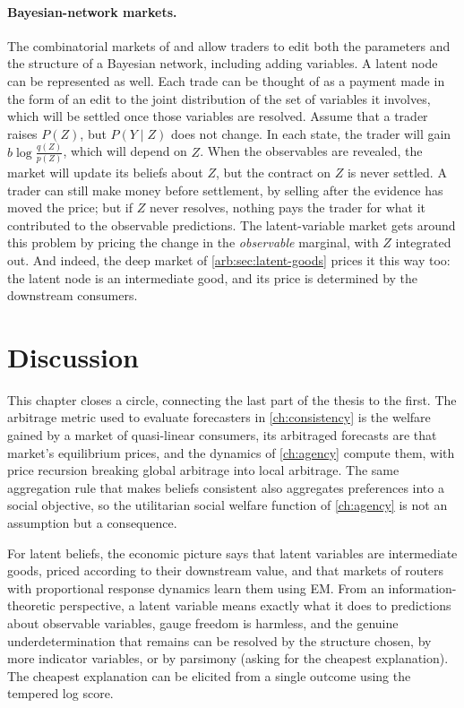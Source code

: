 \begin{draftblock}
\paragraph{Bayesian-network markets.} The combinatorial markets of \citet{sunProbabilityAssetUpdating2012} and \citet{laskeyGraphicalModelMarket2018} allow traders to edit both the parameters and the structure of a Bayesian network, including adding variables. A latent node can be represented as well. Each trade can be thought of as a payment made in the form of an edit to the joint distribution of the set of variables it involves, which will be settled once those variables are resolved. Assume that a trader raises $P(Z)$, but $P(Y\mid Z)$ does not change. In each state, the trader will gain $b\log\frac{q(Z)}{p(Z)}$, which will depend on $Z$. When the observables are revealed, the market will update its beliefs about $Z$, but the contract on $Z$ is never settled. A trader can still make money before settlement, by selling after the evidence has moved the price; but if $Z$ never resolves, nothing pays the trader for what it contributed to the observable predictions. The latent-variable market gets around this problem by pricing the change in the \emph{observable} marginal, with $Z$ integrated out. And indeed, the deep market of \cref{arb:sec:latent-goods} prices it this way too: the latent node is an intermediate good, and its price is determined by the downstream consumers.

\section{Discussion}\label{arb:sec:discussion}

This chapter closes a circle, connecting the last part of the thesis to the first. The arbitrage metric used to evaluate forecasters in \cref{ch:consistency} is the welfare gained by a market of quasi-linear consumers, its arbitraged forecasts are that market's equilibrium prices, and the dynamics of \cref{ch:agency} compute them, with price recursion breaking global arbitrage into local arbitrage. The same aggregation rule that makes beliefs consistent also aggregates preferences into a social objective, so the utilitarian social welfare function of \cref{ch:agency} is not an assumption but a consequence.

For latent beliefs, the economic picture says that latent variables are intermediate goods, priced according to their downstream value, and that markets of routers with proportional response dynamics learn them using EM. From an information-theoretic perspective, a latent variable means exactly what it does to predictions about observable variables, gauge freedom is harmless, and the genuine underdetermination that remains can be resolved by the structure chosen, by more indicator variables, or by parsimony (asking for the cheapest explanation). The cheapest explanation can be elicited from a single outcome using the tempered log score.


\end{draftblock}
